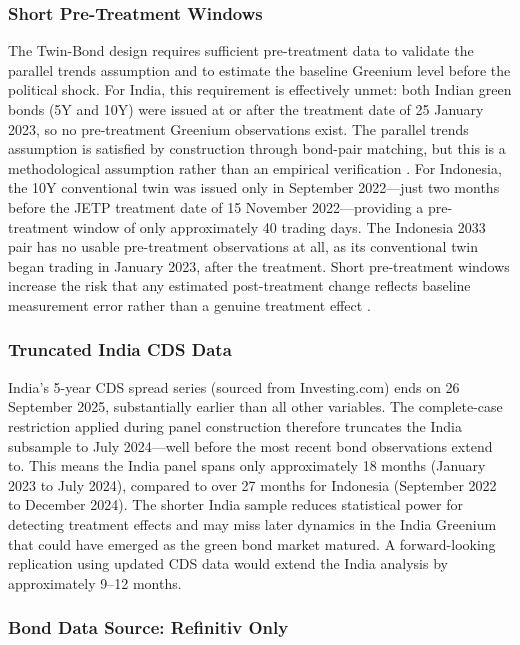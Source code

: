 \documentclass[12pt,a4paper]{article}
\begin{document}
\subsubsection{Short Pre-Treatment Windows}

The Twin-Bond design requires sufficient pre-treatment data to validate the parallel trends assumption and to estimate the baseline Greenium level before the political shock. For India, this requirement is effectively unmet: both Indian green bonds (5Y and 10Y) were issued at or after the treatment date of 25 January 2023, so no pre-treatment Greenium observations exist. The parallel trends assumption is satisfied by construction through bond-pair matching, but this is a methodological assumption rather than an empirical verification \citep{Zerbib2019}. For Indonesia, the 10Y conventional twin was issued only in September 2022---just two months before the JETP treatment date of 15 November 2022---providing a pre-treatment window of only approximately 40 trading days. The Indonesia 2033 pair has no usable pre-treatment observations at all, as its conventional twin began trading in January 2023, after the treatment. Short pre-treatment windows increase the risk that any estimated post-treatment change reflects baseline measurement error rather than a genuine treatment effect \citep{Callaway2021}.

\subsubsection{Truncated India CDS Data}

India's 5-year CDS spread series (sourced from Investing.com) ends on 26 September 2025, substantially earlier than all other variables. The complete-case restriction applied during panel construction therefore truncates the India subsample to July 2024---well before the most recent bond observations extend to. This means the India panel spans only approximately 18 months (January 2023 to July 2024), compared to over 27 months for Indonesia (September 2022 to December 2024). The shorter India sample reduces statistical power for detecting treatment effects and may miss later dynamics in the India Greenium that could have emerged as the green bond market matured. A forward-looking replication using updated CDS data would extend the India analysis by approximately 9--12 months.

\subsubsection{Bond Data Source: Refinitiv Only}
\end{document}
